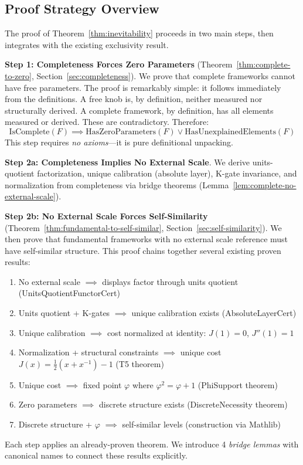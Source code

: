 \documentclass[12pt]{article}
\theoremstyle{remark}
\begin{document}
\subsection{Proof Strategy Overview}

The proof of Theorem~\ref{thm:inevitability} proceeds in two main steps, then integrates with the existing exclusivity result.

\textbf{Step 1: Completeness Forces Zero Parameters} (Theorem~\ref{thm:complete-to-zero}, Section~\ref{sec:completeness}).
We prove that complete frameworks cannot have free parameters. The proof is remarkably simple: it follows immediately from the definitions. A free knob is, by definition, neither measured nor structurally derived. A complete framework, by definition, has all elements measured or derived. These are contradictory. Therefore:
\[
\mathrm{IsComplete}(F) \implies \mathrm{HasZeroParameters}(F) \lor \mathrm{HasUnexplainedElements}(F)
\]
This step requires \emph{no axioms}---it is pure definitional unpacking.

\textbf{Step 2a: Completeness Implies No External Scale}. We derive units-quotient factorization, unique calibration (absolute layer), K-gate invariance, and normalization from completeness via bridge theorems (Lemma~\ref{lem:complete-no-external-scale}).

\textbf{Step 2b: No External Scale Forces Self-Similarity} (Theorem~\ref{thm:fundamental-to-self-similar}, Section~\ref{sec:self-similarity}).
We then prove that fundamental frameworks with no external scale reference must have self-similar structure. This proof chains together several existing proven results:
\begin{enumerate}
\item No external scale $\implies$ displays factor through units quotient (UnitsQuotientFunctorCert)
\item Units quotient + K-gates $\implies$ unique calibration exists (AbsoluteLayerCert)
\item Unique calibration $\implies$ cost normalized at identity: $J(1)=0$, $J''(1)=1$
\item Normalization + structural constraints $\implies$ unique cost $J(x) = \frac{1}{2}(x+x^{-1})-1$ (T5 theorem)
\item Unique cost $\implies$ fixed point $\varphi$ where $\varphi^2 = \varphi + 1$ (PhiSupport theorem)
\item Zero parameters $\implies$ discrete structure exists (DiscreteNecessity theorem)
\item Discrete structure + $\varphi$ $\implies$ self-similar levels (construction via Mathlib)
\end{enumerate}
Each step applies an already-proven theorem. We introduce 4 \emph{bridge lemmas} with canonical names to connect these results explicitly.
\end{document}
